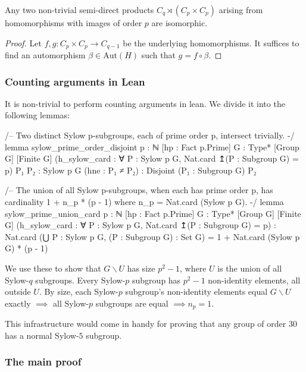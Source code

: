 \documentclass[a4paper,11pt, titlepage]{article}
\theoremstyle{remark}
\begin{document}
\begin{lemma}
    Any two non-trivial semi-direct products $C_q \rtimes (C_p \times C_p)$ arising from homomorphisms with images of order $p$ are isomorphic.
\end{lemma}
\begin{proof}
    Let $f, g : C_p \times C_p \rightarrow C_{q-1}$ be the underlying homomorphisms. It suffices to find an automorphism $\beta \in \text{Aut}(H)$ such that $g = f \circ \beta$. 
\end{proof}

\subsubsection{Counting arguments in Lean}

It is non-trivial to perform counting arguments in lean. We divide it into the following lemmas:

\begin{leancode}
/-- Two distinct Sylow p-subgroups, each of prime order p, intersect trivially. -/
lemma sylow_prime_order_disjoint {p : ℕ} [hp : Fact p.Prime]
    {G : Type*} [Group G] [Finite G]
    (h_sylow_card : ∀ P : Sylow p G, Nat.card ↥(P : Subgroup G) = p)
    {P₁ P₂ : Sylow p G} (hne : P₁ ≠ P₂) :
    Disjoint (P₁ : Subgroup G) P₂
\end{leancode}

\begin{leancode}
/-- The union of all Sylow p-subgroups, when each has prime order p, has
    cardinality 1 + n_p * (p - 1) where n_p = Nat.card (Sylow p G). -/
lemma sylow_prime_union_card {p : ℕ} [hp : Fact p.Prime]
    {G : Type*} [Group G] [Finite G]
    (h_sylow_card : ∀ P : Sylow p G, Nat.card ↥(P : Subgroup G) = p) :
    Nat.card (⋃ P : Sylow p G, (P : Subgroup G) : Set G) =
      1 + Nat.card (Sylow p G) * (p - 1)
\end{leancode}

We use these to show that $G \backslash U$ has size $p^2 - 1$, where $U$ is the union of all Sylow-$q$ subgroups. Every Sylow-$p$ subgroup has $p^2 - 1$ non-identity elements, all outside $U$. By size, each Sylow-$p$ subgroup's non-identity elements equal $G \backslash U$ exactly $\implies$ all Sylow-$p$ subgroups are equal $\implies n_p = 1$.

This infrastructure would come in handy for proving that any group of order $30$ has a normal Sylow-$5$ subgroup.

\subsubsection{The main proof}
\end{document}
